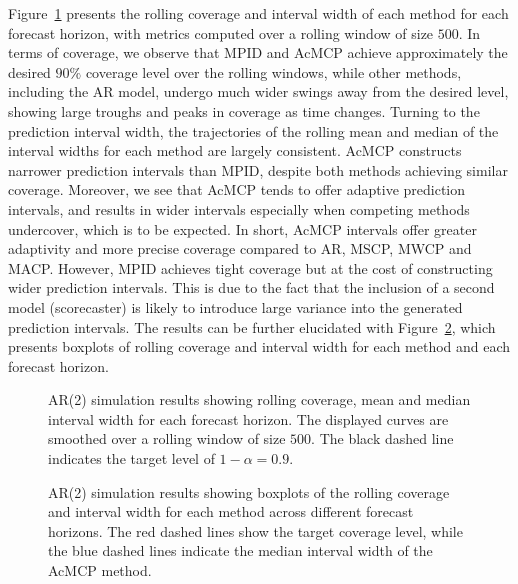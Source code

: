 \documentclass[
  11pt,
  a4paper,
]{article}
\theoremstyle{plain}
\theoremstyle{plain}
\theoremstyle{remark}
\begin{document}
Figure~\ref{fig-AR2_cov} presents the rolling coverage and interval
width of each method for each forecast horizon, with metrics computed
over a rolling window of size \(500\). In terms of coverage, we observe
that MPID and AcMCP achieve approximately the desired \(90\%\) coverage
level over the rolling windows, while other methods, including the AR
model, undergo much wider swings away from the desired level, showing
large troughs and peaks in coverage as time changes. Turning to the
prediction interval width, the trajectories of the rolling mean and
median of the interval widths for each method are largely consistent.
AcMCP constructs narrower prediction intervals than MPID, despite both
methods achieving similar coverage. Moreover, we see that AcMCP tends to
offer adaptive prediction intervals, and results in wider intervals
especially when competing methods undercover, which is to be expected.
In short, AcMCP intervals offer greater adaptivity and more precise
coverage compared to AR, MSCP, MWCP and MACP. However, MPID achieves
tight coverage but at the cost of constructing wider prediction
intervals. This is due to the fact that the inclusion of a second model
(scorecaster) is likely to introduce large variance into the generated
prediction intervals. The results can be further elucidated with
Figure~\ref{fig-AR2_box}, which presents boxplots of rolling coverage
and interval width for each method and each forecast horizon.

\begin{figure}


\caption{\label{fig-AR2_cov}AR(2) simulation results showing rolling
coverage, mean and median interval width for each forecast horizon. The
displayed curves are smoothed over a rolling window of size \(500\). The
black dashed line indicates the target level of \(1-\alpha=0.9\).}

\end{figure}%

\begin{figure}


\caption{\label{fig-AR2_box}AR(2) simulation results showing boxplots of
the rolling coverage and interval width for each method across different
forecast horizons. The red dashed lines show the target coverage level,
while the blue dashed lines indicate the median interval width of the
AcMCP method.}

\end{figure}%
\end{document}
